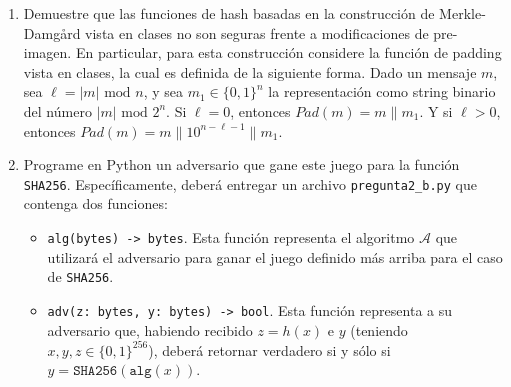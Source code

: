 \begin{enumerate}
\item Demuestre que las funciones de hash basadas en la construcción de Merkle-Damgård vista en clases no son seguras frente a modificaciones de pre-imagen. En particular, para esta construcción considere la función de padding vista en clases, la cual es definida de la siguiente forma. Dado un mensaje $m$, sea $\ell = |m| \text{ mod } n$, y sea $m_1 \in \{0,1\}^n$ la representación como string binario del número $|m| \text{ mod } 2^n$. Si $\ell = 0$, entonces $\textit{Pad}(m) = m \| m_1$. Y si $\ell > 0$, entonces $\textit{Pad}(m) = m \| 1 0^{n - \ell - 1} \| m_1$.



\item Programe en Python un adversario que gane este juego para la función \texttt{SHA256}. Específicamente, deberá entregar un archivo \texttt{pregunta2\_b.py} que contenga dos funciones:
\begin{itemize}
\item \texttt{alg(bytes) -> bytes}. Esta función representa el algoritmo $\mathcal{A}$ que utilizará el adversario para ganar el juego definido más arriba para el caso de \texttt{SHA256}.
\item \texttt{adv(z: bytes, y: bytes) -> bool}. Esta función representa a su adversario que, habiendo recibido $z=h(x)$ e $y$ (teniendo $x,y,z\in\{0,1\}^{256}$), deberá retornar verdadero si y sólo si $y=\texttt{SHA256}(\texttt{alg}(x))$.
\end{itemize}

\end{enumerate}
